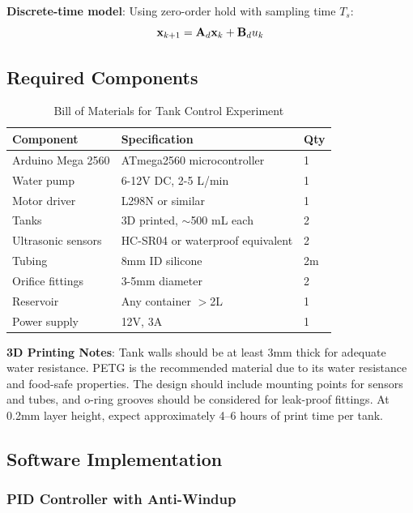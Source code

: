 \textbf{Discrete-time model}: Using zero-order hold with sampling time $T_s$:
\begin{equation}
    \mathbf{x}_{k+1} = \mathbf{A}_d \mathbf{x}_k + \mathbf{B}_d u_k
\end{equation}

\subsection{Required Components}

\begin{table}[htbp]
\centering
\caption{Bill of Materials for Tank Control Experiment}
\label{tab:tank_bom}
\begin{tabular}{lll}
\toprule
\textbf{Component} & \textbf{Specification} & \textbf{Qty} \\
\midrule
Arduino Mega 2560 & ATmega2560 microcontroller & 1 \\
Water pump & 6-12V DC, 2-5 L/min & 1 \\
Motor driver & L298N or similar & 1 \\
Tanks & 3D printed, $\sim$500 mL each & 2 \\
Ultrasonic sensors & HC-SR04 or waterproof equivalent & 2 \\
Tubing & 8mm ID silicone & 2m \\
Orifice fittings & 3-5mm diameter & 2 \\
Reservoir & Any container $>$2L & 1 \\
Power supply & 12V, 3A & 1 \\
\bottomrule
\end{tabular}
\end{table}

\textbf{3D Printing Notes}: Tank walls should be at least 3mm thick for adequate water resistance. PETG is the recommended material due to its water resistance and food-safe properties. The design should include mounting points for sensors and tubes, and o-ring grooves should be considered for leak-proof fittings. At 0.2mm layer height, expect approximately 4--6 hours of print time per tank.

\subsection{Software Implementation}

\subsubsection{PID Controller with Anti-Windup}

